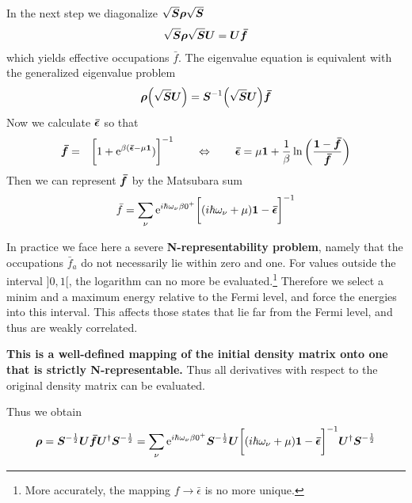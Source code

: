 \documentclass[11pt,a4paper]{report}
\begin{document}
In the next step we diagonalize $\sqrt{\bm{S}}\bm{\rho}\sqrt{\bm{S}}$
\begin{eqnarray}
\sqrt{\bm{S}}\bm{\rho}\sqrt{\bm{S}}\bm{U}=\bm{U}\bm{\bar{f}}
\end{eqnarray}
which yields effective occupations $\bar{f}$. The eigenvalue equation
is equivalent with the generalized eigenvalue problem
\begin{eqnarray}
\bm{\rho}\Bigl(\sqrt{\bm{S}}\bm{U}\Bigr)=\bm{S}^{-1}\Bigl(\sqrt{\bm{S}}\bm{U}\Bigr)\bm{\bar{f}}
\end{eqnarray}
Now we calculate $\bm{\bar{\epsilon}}$ so that
\begin{eqnarray}
\bm{\bar{f}}
&=&\biggl[1+\mathrm{e}^{\beta(\bm{\bar{\epsilon}}-\mu\bm{1}})\biggr]^{-1}
\qquad\Leftrightarrow\qquad
\bm{\bar{\epsilon}}=\mu\bm{1}
+\frac{1}{\beta}\ln\left(\frac{\bm{1}-\bm{\bar{f}}}{\bm{\bar{f}}}\right)
\end{eqnarray}
Then we can represent $\bm{\bar{f}}$ by the Matsubara sum
\begin{eqnarray}
\bar{f}=\sum_\nu\mathrm{e}^{i\hbar\omega_\nu\beta0^+}
\biggl[(i\hbar\omega_\nu+\mu)\bm{1}-\bm{\bar{\epsilon}}\biggr]^{-1}
\end{eqnarray}

In practice we face here a severe \textbf{N-representability
  problem}, namely that the
occupations $\bar{f}_a$ do not necessarily lie within zero and one.
For values outside the interval $]0,1[$, the logarithm can no more be
    evaluated.\footnote{More accurately, the mapping $f\rightarrow
      \bar{\epsilon}$ is no more unique.} Therefore we select a minim
    and a maximum energy relative to the Fermi level, and force the
    energies into this interval. This affects those states that lie
    far from the Fermi level, and thus are weakly correlated.

\textbf{This is a well-defined mapping of the initial density matrix
  onto one that is strictly N-representable.} Thus all derivatives
with respect to the original density matrix can be evaluated.

Thus we obtain
\begin{eqnarray}
\bm{\rho}=\bm{S}^{-\frac{1}{2}}\bm{U}\bm{\bar{f}}\bm{U}^\dagger\bm{S}^{-\frac{1}{2}}
=\sum_\nu\mathrm{e}^{i\hbar\omega_\nu\beta0^+}
\bm{S}^{-\frac{1}{2}}\bm{U}\biggl[(i\hbar\omega_\nu+\mu)\bm{1}
-\bm{\bar{\epsilon}}\biggr]^{-1}\bm{U}^\dagger\bm{S}^{-\frac{1}{2}}
\end{eqnarray}
\end{document}
